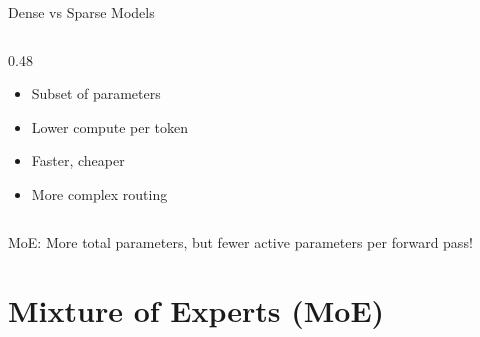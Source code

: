 \documentclass[aspectratio=169]{beamer}
\begin{document}
\begin{frame}[shrink=10]{Dense vs Sparse Models 🎯}
\begin{columns}[T]
\begin{column}{0.48\textwidth}
\vspace{0.3em}

\begin{itemize}\setlength{\itemsep}{0pt}
    \item Subset of parameters
    \item Lower compute per token
    \item Faster, cheaper
    \item More complex routing
\end{itemize}
\end{column}
\end{columns}

\vspace{0.5em}

\begin{thinkbox}
MoE: More total parameters, but fewer active parameters per forward pass!
\end{thinkbox}
\end{frame}

\section{Mixture of Experts (MoE)}
\end{document}
